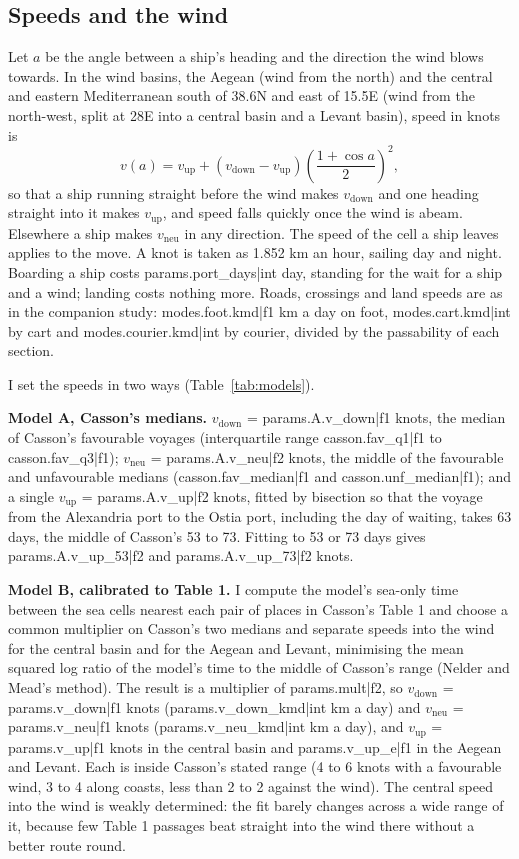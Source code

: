 \documentclass[11pt,a4paper]{article}
\begin{document}
\subsection{Speeds and the wind}
Let $a$ be the angle between a ship's heading and the direction the wind blows towards. In the wind basins, the Aegean (wind from the north) and the central and eastern Mediterranean south of 38.6\textdegree{}N and east of 15.5\textdegree{}E (wind from the north-west, split at 28\textdegree{}E into a central basin and a Levant basin), speed in knots is
\[ v(a) = v_\text{up} + (v_\text{down} - v_\text{up}) \left(\frac{1 + \cos a}{2}\right)^{2}, \]
so that a ship running straight before the wind makes $v_\text{down}$ and one heading straight into it makes $v_\text{up}$, and speed falls quickly once the wind is abeam. Elsewhere a ship makes $v_\text{neu}$ in any direction. The speed of the cell a ship leaves applies to the move. A knot is taken as 1.852 km an hour, sailing day and night. Boarding a ship costs {{params.port_days|int}} day, standing for the wait for a ship and a wind; landing costs nothing more. Roads, crossings and land speeds are as in the companion study: {{modes.foot.kmd|f1}} km a day on foot, {{modes.cart.kmd|int}} by cart and {{modes.courier.kmd|int}} by courier, divided by the passability of each section.

I set the speeds in two ways (Table~\ref{tab:models}).

\textbf{Model A, Casson's medians.} $v_\text{down}$ = {{params.A.v_down|f1}} knots, the median of Casson's favourable voyages (interquartile range {{casson.fav_q1|f1}} to {{casson.fav_q3|f1}}); $v_\text{neu}$ = {{params.A.v_neu|f2}} knots, the middle of the favourable and unfavourable medians ({{casson.fav_median|f1}} and {{casson.unf_median|f1}}); and a single $v_\text{up}$ = {{params.A.v_up|f2}} knots, fitted by bisection so that the voyage from the Alexandria port to the Ostia port, including the day of waiting, takes 63 days, the middle of Casson's 53 to 73. Fitting to 53 or 73 days gives {{params.A.v_up_53|f2}} and {{params.A.v_up_73|f2}} knots.

\textbf{Model B, calibrated to Table 1.} I compute the model's sea-only time between the sea cells nearest each pair of places in Casson's Table 1 and choose a common multiplier on Casson's two medians and separate speeds into the wind for the central basin and for the Aegean and Levant, minimising the mean squared log ratio of the model's time to the middle of Casson's range (Nelder and Mead's method). The result is a multiplier of {{params.mult|f2}}, so $v_\text{down}$ = {{params.v_down|f1}} knots ({{params.v_down_kmd|int}} km a day) and $v_\text{neu}$ = {{params.v_neu|f1}} knots ({{params.v_neu_kmd|int}} km a day), and $v_\text{up}$ = {{params.v_up|f1}} knots in the central basin and {{params.v_up_e|f1}} in the Aegean and Levant. Each is inside Casson's stated range (4 to 6 knots with a favourable wind, 3 to 4 along coasts, less than 2 to 2\textonehalf{} against the wind). The central speed into the wind is weakly determined: the fit barely changes across a wide range of it, because few Table 1 passages beat straight into the wind there without a better route round.
\end{document}
